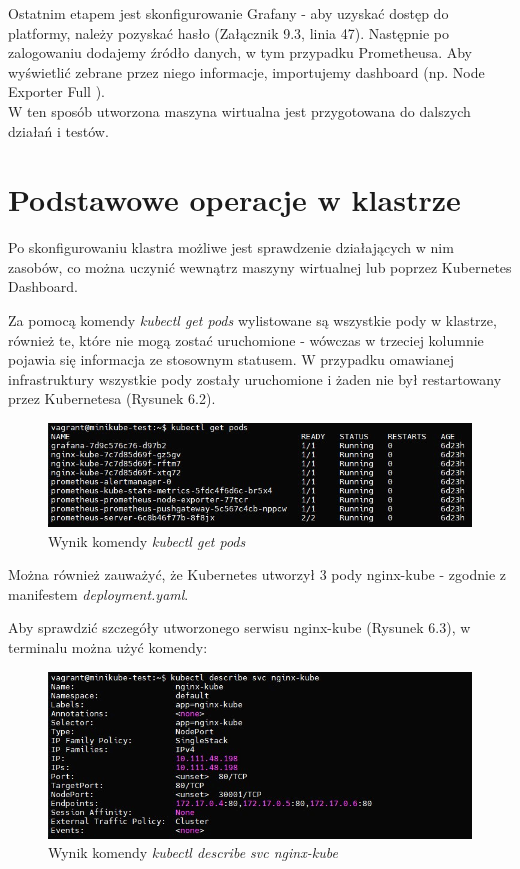 Ostatnim etapem jest skonfigurowanie Grafany - aby uzyskać dostęp do platformy, należy pozyskać hasło (Załącznik 9.3, linia 47). Następnie po zalogowaniu dodajemy źródło danych, w tym przypadku Prometheusa. Aby wyświetlić zebrane przez niego informacje, importujemy dashboard (np. Node Exporter Full \cite{nodeexporterfull}).\\

W ten sposób utworzona maszyna wirtualna jest przygotowana do dalszych działań i testów.


\section{Podstawowe operacje w klastrze}

Po skonfigurowaniu klastra możliwe jest sprawdzenie działających w nim zasobów, co można uczynić wewnątrz maszyny wirtualnej lub poprzez Kubernetes Dashboard.

Za pomocą komendy \textit{kubectl get pods} wylistowane są wszystkie pody w klastrze, również te, które nie mogą zostać uruchomione - wówczas w trzeciej kolumnie pojawia się informacja ze stosownym statusem. 
W przypadku omawianej infrastruktury wszystkie pody zostały uruchomione i żaden nie był restartowany przez Kubernetesa (Rysunek 6.2). 

\begin{figure}[h]
    \centering
    \includegraphics[width=1\textwidth]{img/basic1.png}
    \caption{Wynik komendy \textit{kubectl get pods}}
\end{figure}
\newpage

Można również zauważyć, że Kubernetes utworzył 3 pody nginx-kube - zgodnie z manifestem \textit{deployment.yaml}. 

Aby sprawdzić szczegóły utworzonego serwisu nginx-kube (Rysunek 6.3), w terminalu można użyć komendy: 

\begin{figure}[h]
    \centering
    \includegraphics[width=1\textwidth]{img/basic2.png}
    \caption{Wynik komendy \textit{kubectl describe svc nginx-kube}}
\end{figure}

